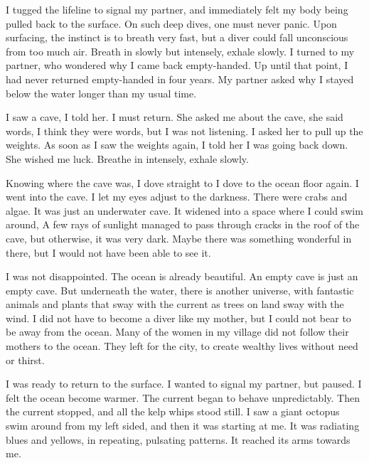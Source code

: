 \documentclass[12pt, letterpaper]{report}
\begin{document}
\vspace{1\baselineskip}
I tugged the lifeline to signal my partner, and immediately felt my body being pulled back to the surface. On such deep dives, one must never panic. Upon surfacing, the instinct is to breath very fast, but a diver could fall unconscious from too much air. Breath in slowly but intensely, exhale slowly. I turned to my partner, who wondered why I came back empty-handed. Up until that point, I had never returned empty-handed in four years. My partner asked why I stayed below the water longer than my usual time.

\vspace{1\baselineskip}
I saw a cave, I told her. I must return. She asked me about the cave, she said words, I think they were words, but I was not listening. I asked her to pull up the weights. As soon as I saw the weights again, I told her I was going back down. She wished me luck. Breathe in intensely, exhale slowly. 

\vspace{1\baselineskip}
Knowing where the cave was, I dove straight to I dove to the ocean floor again. I went into the cave. I let my eyes adjust to the darkness. There were crabs and algae. It was just an underwater cave. It widened into a space where I could swim around, A few rays of sunlight managed to pass through cracks in the roof of the cave, but otherwise, it was very dark. Maybe there was something wonderful in there, but I would not have been able to see it. 

\vspace{1\baselineskip}
I was not disappointed. The ocean is already beautiful. An empty cave is just an empty cave. But underneath the water, there is another universe, with fantastic animals and plants that sway with the current as trees on land sway with the wind. I did not have to become a diver like my mother, but I could not bear to be away from the ocean. Many of the women in my village did not follow their mothers to the ocean. They left for the city, to create wealthy lives without need or thirst.

\vspace{1\baselineskip}
I was ready to return to the surface. I wanted to signal my partner, but paused. I felt the ocean become warmer. The current began to behave unpredictably. Then the current stopped, and all the kelp whips stood still. I saw a giant octopus swim around from my left sided, and then it was starting at me. It was radiating blues and yellows, in repeating, pulsating patterns. It reached its arms towards me.
\end{document}
